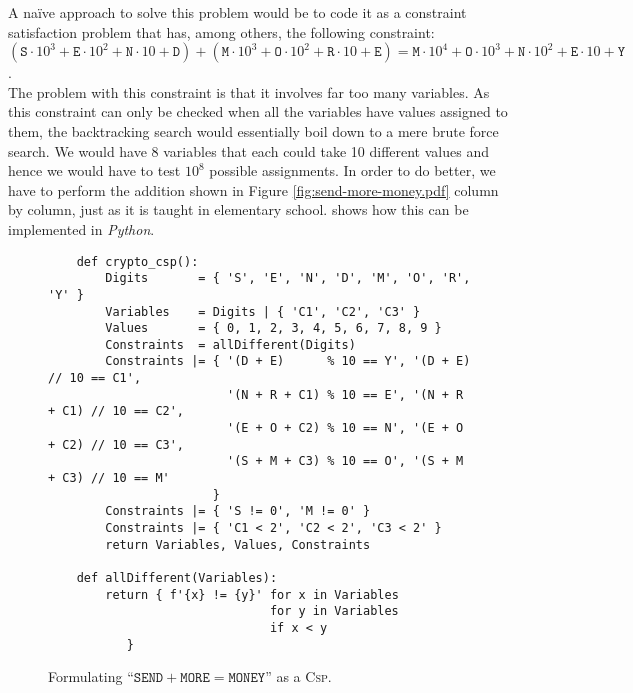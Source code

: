 \noindent
A na\"ive approach to solve this problem would be to code it as a constraint satisfaction problem that has,
among others,  the
following constraint:
\\[0.2cm]
\hspace*{0.0cm}
$   (\texttt{S} \cdot 10^3 + \texttt{E} \cdot 10^2 + \texttt{N} \cdot 10 + \texttt{D}) 
  + (\texttt{M} \cdot 10^3 + \texttt{O} \cdot 10^2 + \texttt{R} \cdot 10 + \texttt{E})
  = \texttt{M} \cdot 10^4 + \texttt{O} \cdot 10^3 + \texttt{N} \cdot 10^2 + \texttt{E} \cdot 10 + \texttt{Y}
$.
\\[0.2cm]
The problem with this constraint is that it involves far too many variables.  As this constraint can only be
checked when all the variables have values assigned to them, the backtracking search would essentially
boil down to a mere brute force search.  We would have 8 variables that each could take 10 different values and
hence we would have to test $10^{8}$ possible assignments. In order to do better, we have to perform the
addition shown in Figure \ref{fig:send-more-money.pdf} column by column, just as it is taught in elementary school.
  shows how this can be implemented in \textsl{Python}.

\begin{figure}[!ht]
\centering
\begin{verbatim}
    def crypto_csp():
        Digits       = { 'S', 'E', 'N', 'D', 'M', 'O', 'R', 'Y' }
        Variables    = Digits | { 'C1', 'C2', 'C3' }
        Values       = { 0, 1, 2, 3, 4, 5, 6, 7, 8, 9 }
        Constraints  = allDifferent(Digits)
        Constraints |= { '(D + E)      % 10 == Y', '(D + E)      // 10 == C1',
                         '(N + R + C1) % 10 == E', '(N + R + C1) // 10 == C2',
                         '(E + O + C2) % 10 == N', '(E + O + C2) // 10 == C3',
                         '(S + M + C3) % 10 == O', '(S + M + C3) // 10 == M'
                       }
        Constraints |= { 'S != 0', 'M != 0' }
        Constraints |= { 'C1 < 2', 'C2 < 2', 'C3 < 2' }
        return Variables, Values, Constraints
    
    def allDifferent(Variables):
        return { f'{x} != {y}' for x in Variables
                               for y in Variables 
                               if x < y 
           }
\end{verbatim}
\vspace*{-0.3cm}
\caption{Formulating ``$\texttt{SEND} + \texttt{MORE} = \texttt{MONEY}$'' as a \textsc{Csp}.}
\label{fig:Crypto-Arithmetic.ipynb}
\end{figure}

